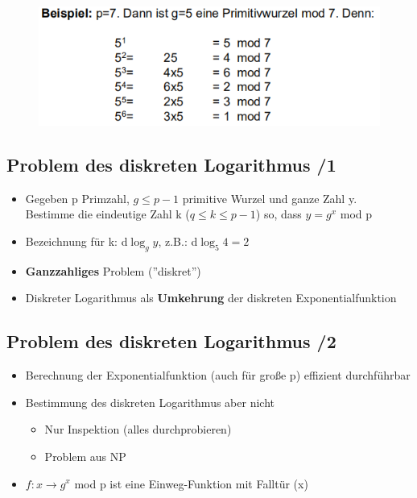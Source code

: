 \documentclass[openany]{book}
\begin{document}
\begin{figure}[h!]
    \centering
    \includegraphics[width=0.85\linewidth]{Pics/PrimitiveRoot.PNG}
\end{figure} 

\subsection{Problem des diskreten Logarithmus /1}

\begin{itemize}
    \item Gegeben p Primzahl, $g\leq p-1$ primitive Wurzel und ganze Zahl y. \\ Bestimme die eindeutige Zahl k ($q\leq k \leq p-1$) so, dass $y=g^x$ mod p
    \item Bezeichnung für k: d$\log_g y$, z.B.: d$\log_5 4 = 2$
    \item \textbf{Ganzzahliges} Problem (''diskret'')
    \item Diskreter Logarithmus als \textbf{Umkehrung} der diskreten Exponentialfunktion
\end{itemize}

\subsection{Problem des diskreten Logarithmus /2}

\begin{itemize}
    \item Berechnung der Exponentialfunktion (auch für große p) effizient durchführbar
    \item Bestimmung des diskreten Logarithmus aber nicht
    \begin{itemize}
        \item Nur Inspektion (alles durchprobieren)
        \item Problem aus NP
    \end{itemize}
    \item $f:x\rightarrow g^x$ mod p ist eine Einweg-Funktion mit Falltür (x)
\end{itemize}
\end{document}
